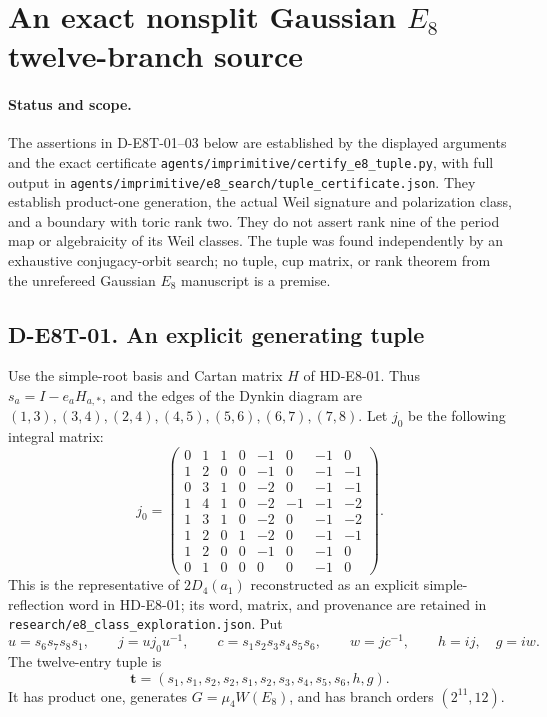 \section{An exact nonsplit Gaussian $E_8$ twelve-branch source}
\label{sec:im-e8-tuple}

\paragraph{Status and scope.}
The assertions in D-E8T-01--03 below are established by the displayed
arguments and the exact certificate
\texttt{agents/imprimitive/certify\_e8\_tuple.py}, with full output in
\texttt{agents/imprimitive/e8\_search/tuple\_certificate.json}.
They establish product-one generation, the actual Weil signature and
polarization class, and a boundary with toric rank two. They do not
assert rank nine of the period map or algebraicity of its Weil classes.
The tuple was found independently by an exhaustive conjugacy-orbit
search; no tuple, cup matrix, or rank theorem from the unrefereed
Gaussian $E_8$ manuscript is a premise.

\subsection*{D-E8T-01. An explicit generating tuple}
Use the simple-root basis and Cartan matrix $H$ of HD-E8-01. Thus
$s_a=I-e_aH_{a,*}$, and the edges of the Dynkin diagram are
$(1,3),(3,4),(2,4),(4,5),(5,6),(6,7),(7,8)$.
Let $j_0$ be the following integral matrix:
\[
j_0=\begin{pmatrix}
0&1&1&0&-1&0&-1&0\\
1&2&0&0&-1&0&-1&-1\\
0&3&1&0&-2&0&-1&-1\\
1&4&1&0&-2&-1&-1&-2\\
1&3&1&0&-2&0&-1&-2\\
1&2&0&1&-2&0&-1&-1\\
1&2&0&0&-1&0&-1&0\\
0&1&0&0&0&0&-1&0
\end{pmatrix}.
\]
This is the representative of $2D_4(a_1)$ reconstructed as an explicit
simple-reflection word in HD-E8-01; its word, matrix, and provenance
are retained in \texttt{research/e8\_class\_exploration.json}.
Put
\[
u=s_6s_7s_8s_1,\qquad j=uj_0u^{-1},\qquad
c=s_1s_2s_3s_4s_5s_6,\qquad w=jc^{-1},\qquad h=ij,\quad g=iw.
\]
The twelve-entry tuple is
\[
\boldsymbol t=(s_1,s_1,s_2,s_2,s_1,s_2,s_3,s_4,s_5,s_6,h,g).
\tag{E8T}
\]
It has product one, generates $G=\mu_4W(E_8)$, and has branch orders
$(2^{11},12)$.

